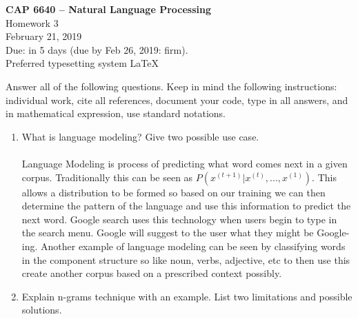 \documentclass[12pt]{article}
\begin{document}
\begin{center}
    {\bf CAP 6640 -- Natural Language Processing}\\
    Homework 3\\
February 21, 2019\\
Due: in 5 days (due by Feb 26, 2019: firm). \\
Preferred typesetting system \LaTeX
\end{center}

Answer all of the following questions.  Keep in mind the following instructions: individual work, cite all references, document your code, type in all answers, and in mathematical expression, use standard notations.

\begin{enumerate}
    \item What is language modeling? Give two possible use case.\\\\
    Language Modeling is process of predicting what word comes next in a given corpus. Traditionally this can be seen as $P(x^{(t+1)} | x^{(t)}, ... , x^{(1)}) $. This allows a distribution to be formed  so based on our training we can then determine the pattern of the language and use this information to predict the next word. Google search uses this technology when users begin to type in the search menu. Google will suggest to the user what they might be Google-ing. Another example of language modeling can be seen by classifying words in the component structure so like noun, verbs, adjective, etc to then use this create another corpus based on a prescribed context possibly. 
     
    \item Explain n-grams technique with an example. List two limitations and possible solutions.
    

\end{enumerate}
\end{document}
